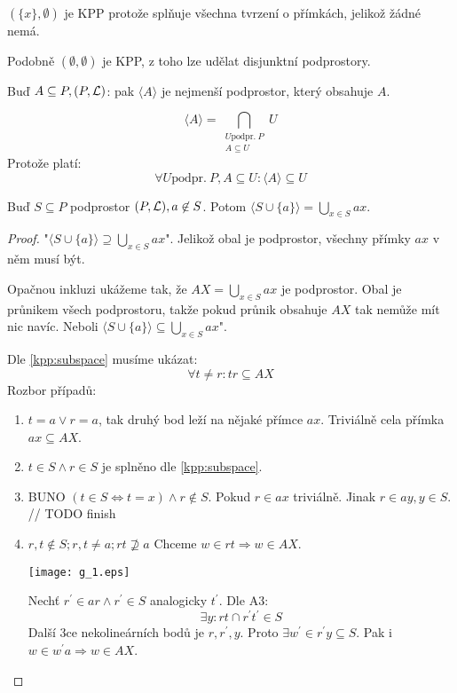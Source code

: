 \begin{observation}
	$(\{ x \}, \emptyset)$ je KPP protože splňuje všechna tvrzení o přímkách, jelikož žádné nemá.

	Podobně $( \emptyset, \emptyset)$ je KPP, z toho lze udělat disjunktní podprostory.
\end{observation}

\begin{definition}[Obal]
    Buď $A \subseteq P, (P, \operatorname{\mathcal{L}})$: pak $\langle A \rangle$ je nejmenší podprostor, který obsahuje $A$.

    \[ \langle A \rangle = \bigcap_{\substack{U \text{podpr.}\ P \\ A \subseteq U }} U \]
    Protože platí:
    \[ \forall U \text{podpr.}\ P, A \subseteq U: \langle A \rangle \subseteq U \]
\end{definition}

\begin{lemma}\label{kpp:point_add_sub}
    Buď $S \subseteq P$ podprostor $(P, \operatorname{\mathcal{L}}), a \not\in S$.
    Potom $\langle S \cup \{a\} \rangle = \bigcup_{x\in S}ax$.
\end{lemma}
\begin{proof}
	"$\langle S \cup \{a\} \rangle \supseteq \bigcup_{x\in S}ax$".
	Jelikož obal je podprostor, všechny přímky $ax$ v něm musí být.

	Opačnou inkluzi ukážeme tak, že $AX = \bigcup_{x\in S} ax$ je podprostor.
	Obal je průnikem všech podprostoru, takže pokud průnik obsahuje $AX$ tak nemůže mít nic navíc.
	Neboli $\langle S \cup \{a\} \rangle \subseteq \bigcup_{x\in S}ax$".

	Dle \cref{kpp:subspace} musíme ukázat:
	\[ \forall t \ne r: tr \subseteq AX \]
	Rozbor případů:
	\begin{enumerate}
		\item $t = a \lor r = a$, tak druhý bod leží na nějaké přímce $ax$.
			Triviálně cela přímka $ax \subseteq AX$.
		\item $t \in S \land r \in S$ je splněno dle \cref{kpp:subspace}.
		\item BUNO $(t \in S \iff t = x) \land r \not\in S$.
			Pokud $r \in ax$ triviálně.
			Jinak $r \in ay, y \in S$.
			// TODO finish
		\item $r, t \notin S; r, t \ne a; rt \nsupseteq a$
			Chceme $w \in rt \Rightarrow w \in AX$.

		\texttt{[image: g\_1.eps]}

		Nechť $r^{\prime} \in ar \land r^{\prime} \in S$ analogicky $t^{\prime}$.
		Dle A3:
		\[ \exists y: rt \cap r^{\prime}t^{\prime} \in S \]
		Další 3ce nekolineárních bodů je $r, r^{\prime}, y$.
		Proto $\exists w^{\prime} \in r^{\prime}y \subseteq S$.
		Pak i $w \in w^{\prime}a \Rightarrow w \in AX$.
	\end{enumerate}
\end{proof}

